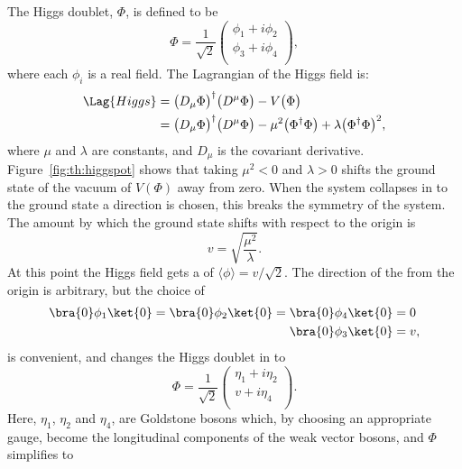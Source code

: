 The Higgs doublet, $\Phi$, is defined to be
\begin{equation}
  \Phi = \frac{1}{\sqrt{2}}
  \begin{pmatrix}
    \phi_1 + i\phi_2 \\
    \phi_3 + i\phi_4 \\
  \end{pmatrix},
  \label{eq:th:phi}
\end{equation}
where each $\phi_i$ is a real field.
The Lagrangian of the Higgs field is:
\begin{align}
  \Lag{Higgs}
  &= \big(D_\mu\Phi\big)^\dagger\big(D^\mu\Phi\big) - V\big(\Phi\big) \nonumber\\
  &= \big(D_\mu\Phi\big)^\dagger\big(D^\mu\Phi\big) - \mu^2\big(\Phi^\dagger\Phi\big) +
  \lambda\big(\Phi^\dagger\Phi\big)^{2},
  \label{eq:th:laghiggs1}
\end{align}
where $\mu$ and $\lambda$ are constants, and $D_\mu$ is the covariant derivative.
Figure~\ref{fig:th:higgspot} shows that
taking $\mu^2<0$ and $\lambda>0$ shifts the ground state of the vacuum of $V(\Phi)$ away from zero.
When the system collapses in to the ground state a direction is chosen, this breaks the symmetry of
the system.
The amount by which the ground state shifts with respect to the origin is
\begin{equation}
  v = \sqrt{\frac{\mu^2}{\lambda}}.
\end{equation}
At this point the Higgs field gets a \VEV of $\langle\phi\rangle = v/\sqrt{2}$.
The direction of the \VEV from the origin is arbitrary, but the choice of
\begin{align}
  \bra{0}\phi_1\ket{0} =
  \bra{0}\phi_2\ket{0} =
  \bra{0}\phi_4\ket{0} &= 0 \nonumber\\
  \bra{0}\phi_3\ket{0} &= v,
\end{align}
is convenient, and changes the Higgs doublet in  to
\begin{equation}
  \Phi = \frac{1}{\sqrt{2}}
  \begin{pmatrix}
    \eta_1 + i\eta_2 \\
    v + i\eta_4 \\
  \end{pmatrix}.
  \label{eq:th:eta}
\end{equation}
Here, $\eta_1$, $\eta_2$ and $\eta_4$, are Goldstone bosons which, by choosing an appropriate
gauge, become the longitudinal components of the weak vector bosons, and $\Phi$ simplifies to
